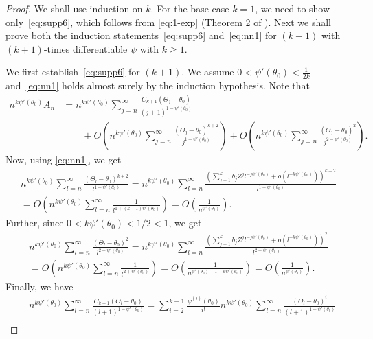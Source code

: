 \documentclass[12pt]{amsart}
\theoremstyle{plain}
\theoremstyle{remark}
\numberwithin{equation}{section}
\begin{document}
\begin{proof}
   We shall use induction on $k$. For the base case $k=1$, we need to show only~\eqref{eq:supp6}, which follows from \eqref{eq:1-exp} (Theorem 2 of \cite{major1973limit}). Next we shall prove both the induction statements~\eqref{eq:supp6} and~\eqref{eq:nn1} for $(k+1)$ with $(k+1)$-times differentiable $\psi$ with $k\geq 1$.
   
   We first establish~\eqref{eq:supp6} for $(k+1)$. We assume $0 < \psi'(\theta_0) < \frac{1}{2k}$ and~\eqref{eq:nn1} holds almost surely by the induction hypothesis. Note that
\begin{align}\label{eq:supp2}
    n^{k\psi'(\theta_0)}A_n &=  n^{k\psi'(\theta_0)}\sum_{j=n}^{\infty}\frac{C_{k+1}(\Theta_j - \theta_0)}{{(j+1)}^{1-\psi'(\theta_0)}} \nonumber \\ 
    & \qquad + O\left(n^{k\psi'(\theta_0)}\sum_{j=n}^{\infty}\frac{(\Theta_j - \theta_0)^{k+2}}{{j}^{1-\psi'(\theta_0)}}\right) + O\left(n^{k\psi'(\theta_0)}\sum_{j=n}^{\infty}\frac{(\Theta_j - \theta_0)^{2}}{{j}^{2-\psi'(\theta_0)}}\right).
\end{align}
Now, using \eqref{eq:nn1}, we get
\begin{multline}\label{eq:supp3}
n^{k\psi'(\theta_0)}\sum_{l=n}^{\infty}\frac{(\Theta_l - \theta_0)^{k+2}}{{l}^{1-\psi'(\theta_0)}} = n^{k\psi'(\theta_0)}\sum_{l=n}^{\infty}\frac{\left(\sum_{j = 1}^k b_j %
    Z^j l^{-j\psi'(\theta_0)} + o(l^{-k\psi'(\theta_0)})\right)^{k+2}}{{l}^{1-\psi'(\theta_0)}}
    \\ = O\left(n^{k\psi'(\theta_0)}\sum_{l=n}^{\infty}\frac{1}{{l}^{1 + (k+1)\psi'(\theta_0)}}\right)
    = O\left(\frac{1}{n^{\psi'(\theta_0)}}\right).
\end{multline}
Further, since $0<k \psi'(\theta_0) < 1/2 < 1$, we get
\begin{multline}\label{eq:supp4}
n^{k\psi'(\theta_0)}\sum_{l=n}^{\infty}\frac{(\Theta_l - \theta_0)^{2}}{{l}^{2-\psi'(\theta_0)}} = n^{k\psi'(\theta_0)}\sum_{l=n}^{\infty}\frac{\left(\sum_{j = 1}^k b_j 
Z^j l^{-j \psi'(\theta_0)} + o(l^{-k\psi'(\theta_0)})\right)^{2}}{{l}^{2-\psi'(\theta_0)}}
    \\ = O\left(n^{k\psi'(\theta_0)}\sum_{l=n}^{\infty}\frac{1}{{l}^{2+\psi'(\theta_0)}}\right)
    = O\left(\frac{1}{n^{\psi'(\theta_0)+ 1-k\psi'(\theta_0)}}\right) %
    = O\left(\frac{1}{n^{\psi'(\theta_0)}}\right).
\end{multline}
Finally, we have
\begin{align}
&n^{k\psi'(\theta_0)}\sum_{l=n}^{\infty}\frac{C_{k+1}(\Theta_l - \theta_0)}{{(l+1)}^{1-\psi'(\theta_0)}} = \sum_{i=2}^{k+1}\frac{\psi^{(i)}(\theta_0)}{i!}n^{k\psi'(\theta_0)}\sum_{l=n}^{\infty}\frac{(\Theta_l - \theta_0)^i}{{(l+1)}^{1-\psi'(\theta_0)}} \nonumber\\

\end{align}
\end{proof}
\end{document}
